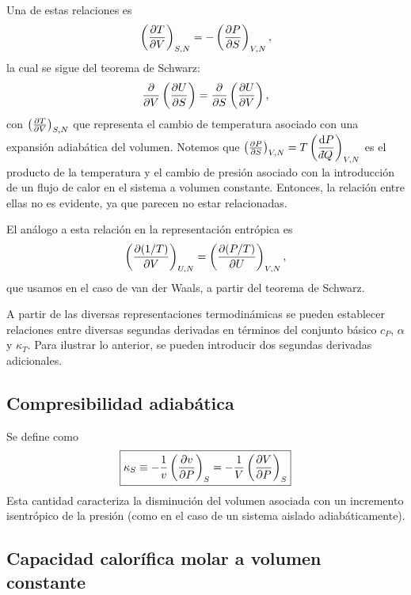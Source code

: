 Una de estas relaciones es
\begin{equation*}
  \left(\frac{\partial T}{\partial V}\right)_{S,N}=-\left(\frac{\partial P}{\partial S}\right)_{V,N},
\end{equation*}
la cual se sigue del teorema de Schwarz:
\begin{equation*}
  \pdv{V}\left(\pdv{U}{S}\right)=\pdv{S}\left(\pdv{U}{V}\right),
\end{equation*}
con $\left(\frac{\partial T}{\partial V}\right)_{S,N}$ que representa el cambio de temperatura asociado con una expansión adiabática
del volumen. Notemos que $\pdvc{P}{S}{V,N}=T\left(\dfrac{\dd P}{\dbar Q}\right)_{V,N}$ es el producto
de la temperatura y el cambio de presión asociado con la introducción de un flujo de calor en el
sistema a volumen constante. Entonces, la relación entre ellas no es evidente, ya que parecen no
estar relacionadas.

El análogo a esta relación en la representación entrópica es
\begin{equation*}
  \left(\frac{\partial (1/T)}{\partial V}\right)_{U,N}=\left(\frac{\partial (P/T)}{\partial U}\right)_{V,N},
\end{equation*}
que usamos en el caso de van der Waals, a partir del teorema de Schwarz.

A partir de las diversas representaciones termodinámicas se pueden establecer relaciones entre
diversas segundas derivadas en términos del conjunto básico $c_P$, $\alpha$ y $\kappa_T$. Para
ilustrar lo anterior, se pueden introducir dos segundas derivadas adicionales.

\subsection*{Compresibilidad adiabática}

Se define como
\begin{equation*}
  \boxed{\kappa_S\equiv-\frac{1}{v}\left(\frac{\partial v}{\partial P}\right)_{S}=-\frac{1}{V}\left(\frac{\partial V}{\partial P}\right)_{S}}
\end{equation*}
Esta cantidad caracteriza la disminución del volumen asociada con un incremento isentrópico de la
presión (como en el caso de un sistema aislado adiabáticamente).

\subsection*{Capacidad calorífica molar a volumen constante}

